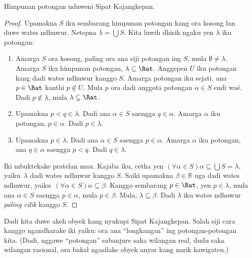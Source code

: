 \documentclass[../../../include/open-logic-section]{subfiles}
\begin{document}
\begin{thm}
Himpunan potongan nduweni Sipat Kajangkepan.
\end{thm}

\begin{proof}
Upamakna $S$ iku sembarang himpunan potongan kang ora kosong lan duwe
wates ndhuwur. Netepna $\lambda = \bigcup S$.
Kita luwih dhisik ngaku yen $\lambda$ iku potongan:
\begin{enumerate}
\item Amarga $S$ ora kosong, paling ora ana siji potongan ing $S$, mula
$\emptyset \neq \lambda$. Amarga $S$ iku himpunan potongan, $\lambda
\subseteq \Rat$. Anggepen $U$ iku potongan kang dadi wates ndhuwur kanggo $S$.
Amarga potongan iku sejati, ana $p \in \Rat$ kanthi $p\notin U$.
Mula $p$ ora dadi anggota potongan $\alpha \in S$ endi waé.
Dadi $p\notin \lambda$, mula $\lambda \subsetneq \Rat$.
\item Upamakna $p < q \in \lambda$. Dadi ana $\alpha \in S$ saengga
$q \in \alpha$. Amarga $\alpha$ iku potongan, $p \in \alpha$. Dadi
$p \in \lambda$.
\item Upamakna $p \in \lambda$. Dadi ana $\alpha \in S$ saengga
$p \in \alpha$. Amarga $\alpha$ iku potongan, ana $q \in \alpha$
saengga $p < q$. Dadi $q \in \lambda$.
\end{enumerate}
Iki mbuktekake pratelan mau. Kajaba iku, cetha yen $(\forall \alpha \in
S)\alpha \subseteq \bigcup S = \lambda$, yaiku\ $\lambda$ dadi wates
ndhuwur kanggo $S$. Saiki upamakna $\beta \in \mathbb{R}$ uga dadi wates
ndhuwur, yaiku\ $(\forall \alpha \in S)\alpha \subseteq \beta$. Kanggo
sembarang $p \in \Rat$, yen $p \in \lambda$, mula ana $\alpha \in S$
saengga $p \in \alpha$, mula $p \in \beta$. Mula,
$\lambda \subseteq \beta$. Dadi $\lambda$ iku wates ndhuwur
\emph{paling cilik} kanggo $S$.
\end{proof}

Dadi kita duwe akeh obyek kang nyukupi Sipat Kajangkepan. Salah siji
cara kanggo ngandharake iki yaiku: ora ana ``longkangan'' ing
potongan-potongan kita. (Dadi, nggawe ``potongan'' sabanjure saka wilangan
real, dudu saka wilangan rasional, ora bakal ngasilake obyek anyar kang
narik kawigaten.)
\end{document}
